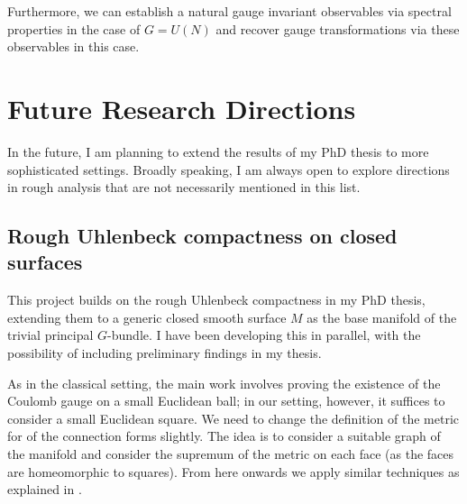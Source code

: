 \documentclass[11pt]{article}
\numberwithin{equation}{section}
\theoremstyle{definition}
\theoremstyle{remark}
\newcommand{\1}{\mathbf 1}
\newcommand{\<}{\langle}
\renewcommand{\>}{\rangle}
\begin{document}
Furthermore, we can establish a natural gauge invariant observables via spectral properties  in the case of $G=U(N)$ and recover gauge transformations via these observables in this case.  



\section{Future Research Directions}\label{sec:future}
In the future, I am planning to extend the results of my PhD thesis to more sophisticated settings. Broadly speaking, I am always open to explore directions in rough analysis that are not necessarily mentioned in this list. 



\subsection{Rough Uhlenbeck compactness on closed surfaces}
%
This project builds on the rough Uhlenbeck compactness in my PhD thesis, extending them to a generic closed smooth surface $M$ as the base manifold of the trivial principal $G$-bundle. I have been developing this in parallel, with the possibility of including preliminary findings in my thesis.
%
%

As in the classical setting, the main work involves proving the existence of the Coulomb gauge on a small Euclidean ball; in our setting, however, it suffices to consider a small Euclidean square. We need to change the definition of the metric for of the connection forms slightly. The idea is to consider a suitable graph of the manifold and consider the supremum of the metric on each face (as the faces are homeomorphic to squares). From here onwards we apply similar techniques as explained in . 


\end{document}
